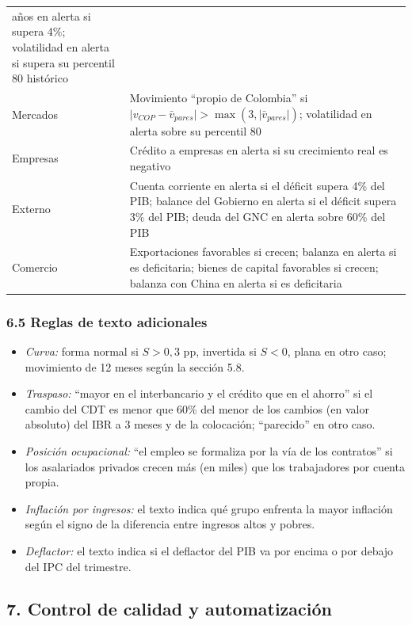 \begin{longtable}[]{@{}
  >{\raggedright\arraybackslash}p{}
  >{\raggedright\arraybackslash}p{}@{}}
años en alerta si supera 4\%; volatilidad en alerta si supera su
percentil 80 histórico \\
Mercados & Movimiento ``propio de Colombia'' si
\(\lvert v_{COP}-\bar v_{pares}\rvert>\max(3,\lvert\bar v_{pares}\rvert)\);
volatilidad en alerta sobre su percentil 80 \\
Empresas & Crédito a empresas en alerta si su crecimiento real es
negativo \\
Externo & Cuenta corriente en alerta si el déficit supera 4\% del PIB;
balance del Gobierno en alerta si el déficit supera 3\% del PIB; deuda
del GNC en alerta sobre 60\% del PIB \\
Comercio & Exportaciones favorables si crecen; balanza en alerta si es
deficitaria; bienes de capital favorables si crecen; balanza con China
en alerta si es deficitaria \\
\end{longtable}\normalsize

\hypertarget{reglas-de-texto-adicionales}{%
\subsubsection{6.5 Reglas de texto
adicionales}\label{reglas-de-texto-adicionales}}

\begin{itemize}
\tightlist
\item
  \emph{Curva:} forma normal si \(S>0{,}3\) pp, invertida si \(S<0\),
  plana en otro caso; movimiento de 12 meses según la sección 5.8.
\item
  \emph{Traspaso:} ``mayor en el interbancario y el crédito que en el
  ahorro'' si el cambio del CDT es menor que 60\% del menor de los
  cambios (en valor absoluto) del IBR a 3 meses y de la colocación;
  ``parecido'' en otro caso.
\item
  \emph{Posición ocupacional:} ``el empleo se formaliza por la vía de
  los contratos'' si los asalariados privados crecen más (en miles) que
  los trabajadores por cuenta propia.
\item
  \emph{Inflación por ingresos:} el texto indica qué grupo enfrenta la
  mayor inflación según el signo de la diferencia entre ingresos altos y
  pobres.
\item
  \emph{Deflactor:} el texto indica si el deflactor del PIB va por
  encima o por debajo del IPC del trimestre.
\end{itemize}

\hypertarget{control-de-calidad-y-automatizaciuxf3n}{%
\subsection{7. Control de calidad y
automatización}\label{control-de-calidad-y-automatizaciuxf3n}}

